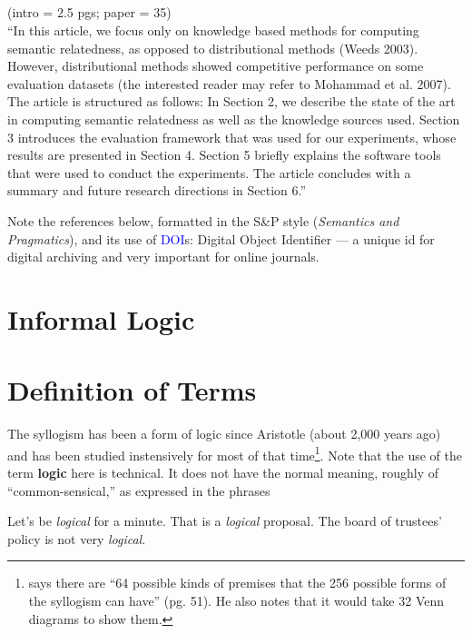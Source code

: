\documentclass{article}
\begin{document}
\subsection{\cite{zeschgurevychsemrelate09}}
(intro = 2.5 pgs; paper = 35)\\
``In this article, we focus only on knowledge based methods for computing
semantic relatedness, as opposed to distributional methods (Weeds 2003). However,
distributional methods showed competitive performance on some evaluation datasets
(the interested reader may refer to Mohammad et al. 2007).
The article is structured as follows: In Section 2, we describe the state of the art
in computing semantic relatedness as well as the knowledge sources used. Section 3
introduces the evaluation framework that was used for our experiments, whose
results are presented in Section 4. Section 5 briefly explains the software tools that
were used to conduct the experiments. The article concludes with a summary and
future research directions in Section 6.''

\begin{remark}
    Note the references below, formatted in the S\&P style (\textsl{Semantics and Pragmatics}), and its use of \textcolor{blue}{DOI}s: Digital Object Identifier --- a unique id for digital archiving and very important for online journals. 
\end{remark}

\newpage
\section{Informal Logic}
\section{Definition of Terms}
The syllogism has been a form of logic since Aristotle (about 2,000 years ago) and has been studied instensively for most of that time\footnote{\cite{barker03logic} says there are ``64 possible kinds of premises that the 256 possible forms of the syllogism can have'' (pg. 51). He also notes that it would take 32 Venn diagrams to show them.}. Note that the use of the term \textbf{logic} here is technical. It does not have the normal meaning, roughly of ``common-sensical,'' as expressed in the phrases

\begin{exe}
\ex Let's be \textsl{logical} for a minute.
\ex That is a \textsl{logical} proposal.
\ex The board of trustees' policy is not very \textsl{logical}.
\end{exe}
\end{document}
